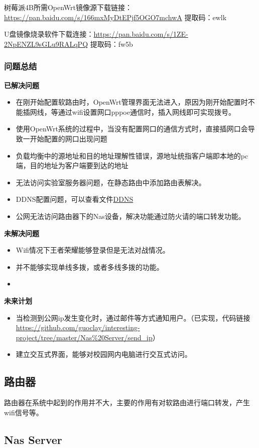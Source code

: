 \documentclass[cn,hazy,blue,10.5pt,normal]{elegantnote}
\begin{document}
树莓派4B所需OpenWrt镜像源下载链接：\url{https://pan.baidu.com/s/166mxMyDtEPjf5OGO7mchwA}  提取码：ewlk 


U盘镜像烧录软件下载连接：\url{https://pan.baidu.com/s/1ZE-2NpENZL9sGLu9RALqPQ}  提取码：fw5b


\subsubsection{问题总结} 

\textbf{已解决问题}
\begin{itemize}
  \item 在刚开始配置软路由时，OpenWrt管理界面无法进入，原因为刚开始配置时不能插网线，等通过wifi设置网口pppoe通信时，插入网线即可实现拨号。
  \item 使用OpenWrt系统的过程中，当没有配置网口的通信方式时，直接插网口会导致一开始配置的网口出现问题
  \item 负载均衡中的源地址和目的地址理解性错误，源地址统指客户端即本地的pc端，目的地址为客户端要到达的地址
  \item 无法访问实验室服务器问题，在静态路由中添加路由表解决。
  \item DDNS配置问题，可以查看文件\href{run:./other_guide/openwrt_set_DDNS.pdf}{DDNS}
  \item 公网无法访问路由器下的Nas设备，解决功能通过防火请的端口转发功能。
\end{itemize}

\textbf{未解决问题}
\begin{itemize}
  \item Wifi情况下王者荣耀能够登录但是无法对战情况。
  \item 并不能够实现单线多拨，或者多线多拨的功能。
  \item 
\end{itemize}

\textbf{未来计划}
\begin{itemize}
  \item 当检测到公网ip发生变化时，通过邮件等方式通知用户。（已实现，代码链接\url{https://github.com/guoclay/interesting-project/tree/master/Nas%20Server/send_ip}）
  \item 建立交互式界面，能够对校园网内电脑进行交互式访问。
\end{itemize}



\subsection{路由器}
路由器在系统中起到的作用并不大，主要的作用有对软路由进行端口转发，产生wifi信号等。

\subsection{Nas Server}
\end{document}
